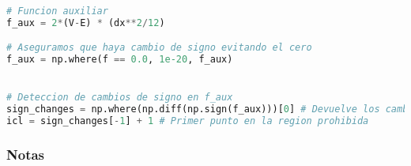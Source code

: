 \documentclass[11pt]{article}
\begin{document}
\begin{lstlisting}[language=Python,numbers=none]

# Funcion auxiliar
f_aux = 2*(V-E) * (dx**2/12)

# Aseguramos que haya cambio de signo evitando el cero
f_aux = np.where(f == 0.0, 1e-20, f_aux)


# Deteccion de cambios de signo en f_aux
sign_changes = np.where(np.diff(np.sign(f_aux)))[0] # Devuelve los cambios de signo
icl = sign_changes[-1] + 1 # Primer punto en la region prohibida

\end{lstlisting}
\subsubsection{Notas}
\label{sec:org9bcdc05}
\end{document}
